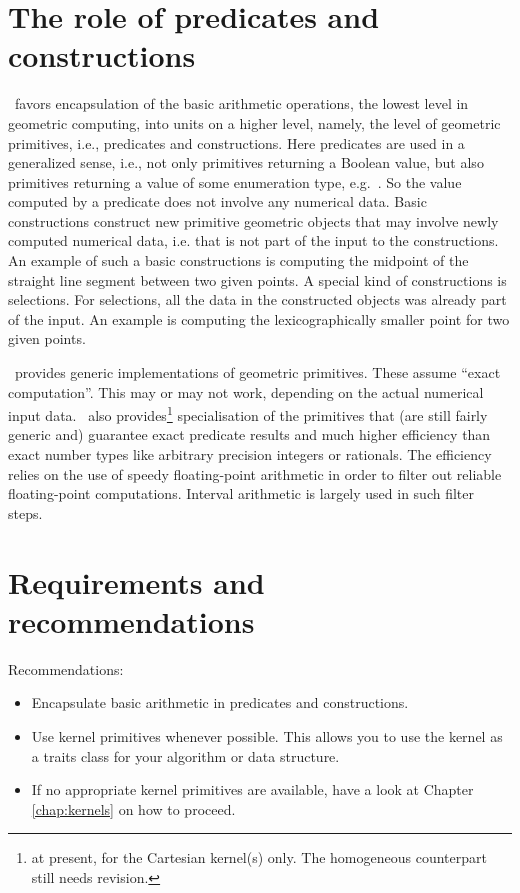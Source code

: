 \section{The role of predicates and constructions}
\cgal\ favors encapsulation of the basic arithmetic operations, the lowest
level in geometric computing, into units on a higher level, namely,
the level of geometric primitives, i.e., predicates and constructions. 
Here predicates are used in a generalized sense, i.e., not only primitives 
returning a Boolean value, but also primitives returning a value of 
some enumeration type, e.g.\ . So the value computed
by a predicate does not involve any numerical data. Basic constructions 
construct new primitive geometric objects that may involve newly computed
numerical data, i.e. that is not part of the input to the constructions. 
An example of such a basic constructions is computing the midpoint of
the straight line segment between two given points.
A special kind of constructions is selections. For selections, all the data
in the constructed objects was already part of the input. An example is
computing the lexicographically smaller point for two given points.

\cgal\ provides generic implementations of geometric primitives. These assume
``exact computation''. This may or may not work, depending on the actual
numerical input data. \cgal\ also provides\footnote{at present, for the 
Cartesian kernel(s) only. The homogeneous counterpart still needs revision.}
specialisation of the primitives
that (are still fairly generic and) guarantee exact predicate results and
much higher efficiency than exact number types like arbitrary precision
integers or rationals. The efficiency relies on the use of speedy 
floating-point arithmetic in order to filter out reliable floating-point 
computations. Interval arithmetic is largely used in such filter steps.

\section{Requirements and recommendations}

Recommendations:
\begin{itemize}
\item Encapsulate basic arithmetic in predicates and constructions.
\item Use kernel primitives whenever possible. This allows you to use 
the kernel as a traits class for your algorithm or data structure.
\item If no appropriate kernel primitives are available, have a look at
Chapter \ref{chap:kernels} on how to proceed.
\end{itemize}

